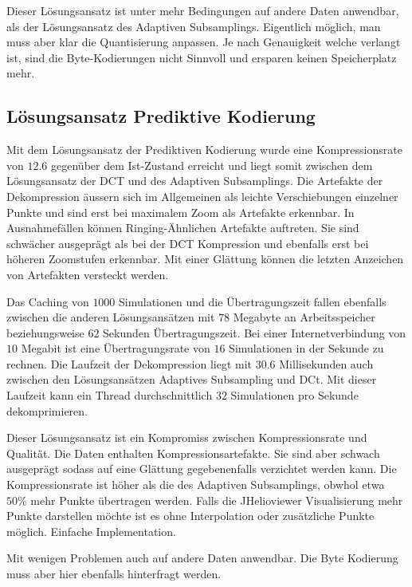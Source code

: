 Dieser Lösungsansatz ist unter mehr Bedingungen auf andere Daten anwendbar, als der Lösungsansatz des Adaptiven Subsamplings. Eigentlich möglich, man muss aber klar die Quantisierung anpassen. Je nach Genauigkeit welche verlangt ist, sind die Byte-Kodierungen nicht Sinnvoll und ersparen keinen Speicherplatz mehr.

\subsection{Lösungsansatz Prediktive Kodierung}
Mit dem Lösungsansatz der Prediktiven Kodierung wurde eine Kompressionsrate von $12.6$ gegenüber dem Ist-Zustand erreicht und liegt somit zwischen dem Lösungsansatz der DCT und des Adaptiven Subsamplings. Die Artefakte der Dekompression äussern sich im Allgemeinen als leichte Verschiebungen einzelner Punkte und sind erst bei maximalem Zoom als Artefakte erkennbar. In Ausnahmefällen können Ringing-Ähnlichen Artefakte auftreten. Sie sind schwächer ausgeprägt als bei der DCT Kompression und ebenfalls erst bei höheren Zoomstufen erkennbar. Mit einer Glättung können die letzten Anzeichen von Artefakten versteckt werden. 

Das Caching von $1000$ Simulationen und die Übertragungszeit fallen ebenfalls zwischen die anderen Lösungsansätzen mit $78$ Megabyte an Arbeitsspeicher beziehungsweise $62$ Sekunden Übertragungszeit. Bei einer Internetverbindung von $10$ Megabit ist eine Übertragungsrate von $16$ Simulationen in der Sekunde zu rechnen. Die Laufzeit der Dekompression liegt mit $30.6$ Millisekunden auch zwischen den Lösungsansätzen Adaptives Subsampling und DCt. Mit dieser Laufzeit kann ein Thread durchschnittlich $32$ Simulationen pro Sekunde dekomprimieren.

Dieser Lösungsansatz ist ein Kompromiss zwischen Kompressionsrate und Qualität. Die Daten enthalten Kompressionsartefakte. Sie sind aber schwach ausgeprägt sodass auf eine Glättung gegebenenfalls verzichtet werden kann. Die Kompressionsrate ist höher als die des Adaptiven Subsamplings, obwhol etwa $50\%$ mehr Punkte übertragen werden. Falls die JHelioviewer Visualisierung mehr Punkte darstellen möchte ist es ohne Interpolation oder zusätzliche Punkte möglich. Einfache Implementation.

Mit wenigen Problemen auch auf andere Daten anwendbar. Die Byte Kodierung muss aber hier ebenfalls hinterfragt werden.